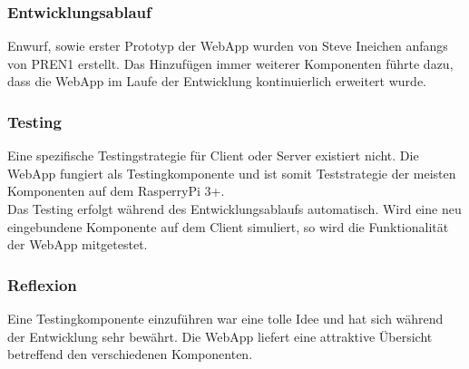 \documentclass[../../main.tex]{subfiles}
\begin{document}
\subsubsection{Entwicklungsablauf}
Enwurf, sowie erster Prototyp der WebApp wurden von Steve Ineichen anfangs von PREN1 erstellt. Das Hinzufügen immer weiterer Komponenten führte dazu, dass die WebApp im Laufe der Entwicklung kontinuierlich erweitert wurde.

\subsubsection{Testing}
Eine spezifische Testingstrategie für Client oder Server existiert nicht. Die WebApp fungiert als Testingkomponente und ist somit Teststrategie der meisten Komponenten auf dem RasperryPi 3+.
\\
Das Testing erfolgt während des Entwicklungsablaufs automatisch. Wird eine neu eingebundene Komponente auf dem Client simuliert, so wird die Funktionalität der WebApp mitgetestet.

\subsubsection{Reflexion}
Eine Testingkomponente einzuführen war eine tolle Idee und hat sich während der Entwicklung sehr bewährt. Die WebApp liefert eine attraktive Übersicht betreffend den verschiedenen Komponenten.
\end{document}

